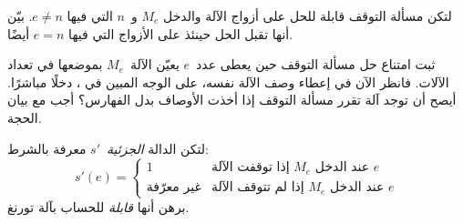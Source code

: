 \documentclass[../../../include/open-logic-section]{subfiles}
\begin{document}
\begin{prob}
لتكن مسألة التوقف قابلة للحل على أزواج الآلة والدخل
$M_e$ و~$n$ التي فيها $e\neq n$. بيّن أنها تقبل الحل حينئذ
على الأزواج التي فيها $e=n$ أيضًا.
\end{prob}

\begin{prob}
ثبت امتناع حل مسألة التوقف حين يعطى عدد~$e$ يعيّن الآلة~$M_e$
بموضعها في تعداد الآلات. فانظر الآن في إعطاء وصف الآلة نفسه،
على الوجه المبين في ، دخلًا مباشرًا.
أيصح أن توجد آلة تقرر مسألة التوقف إذا أخذت الأوصاف بدل الفهارس؟
أجب مع بيان الحجة.
\end{prob}

\begin{prob} لتكن الدالة \emph{الجزئية}~$s'$ معرفة بالشرط:
  \[
  s'(e) =
  \begin{cases}
    \text{1} & \text{إذا توقفت الآلة~$M_e$ عند الدخل $e$}\\
    \text{غير معرّفة} & \text{إذا لم تتوقف الآلة~$M_e$ عند الدخل $e$}
  \end{cases}
  \]
  برهن أنها \emph{قابلة} للحساب بآلة تورنغ.
\end{prob}
\end{document}
